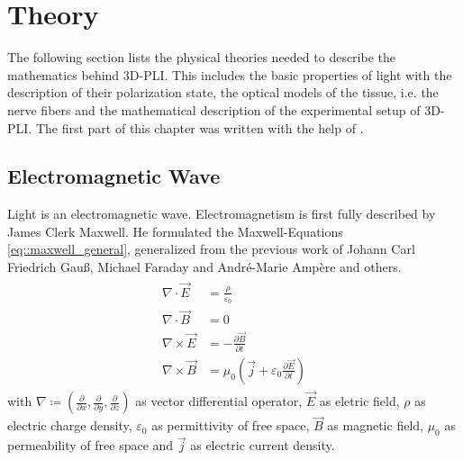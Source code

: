\setcounter{chapter}{2}
\chapter{Theory}
\label{sec:theory}
%
The following section lists the physical theories needed to describe the mathematics behind \ac{3D-PLI}. This includes the basic properties of light with the description of their polarization state, the optical models of the tissue, i.e. the nerve fibers and the mathematical description of the experimental setup of \ac{3D-PLI}. The first part of this chapter was written with the help of \cite{demtroeder2, Fliebach2012}.
% 
% 
% 
\section{Electromagnetic Wave}
% 
Light is an electromagnetic wave. Electromagnetism is first fully described by James Clerk Maxwell. He formulated the Maxwell-Equations \cref{eq::maxwell_general}, generalized from the previous work of Johann Carl Friedrich Gau{\ss}, Michael Faraday and Andr\'{e}-Marie Amp\`{e}re and others. 
% 
% 
\begin{align} 
\begin{split} \label{eq::maxwell_general}
    \nabla \cdot \vec{E} &= \frac {\rho} {\varepsilon_0}\\
    \nabla \cdot \vec{B} &= 0\\
    \nabla \times \vec{E} &= -\frac{\partial \vec{B}} {\partial t}\\
    \nabla \times \vec{B} &= \mu_0\left(\vec{j} + \varepsilon_0 \frac{\partial \vec{E}} {\partial t} \right)
\end{split}
\end{align}
% 
with $\nabla \coloneqq \left({\frac{\partial}{\partial x}}, {\frac{\partial}{\partial y}}, {\frac{\partial}{\partial z}} \right)$ as vector differential operator, $\vec{E}$ as eletric field, $\rho$ as electric charge density, $\varepsilon_0$ as permittivity of free space, $\vec{B}$ as magnetic field, $\mu_0$ as permeability of free space and $\vec{j}$ as electric current density.

